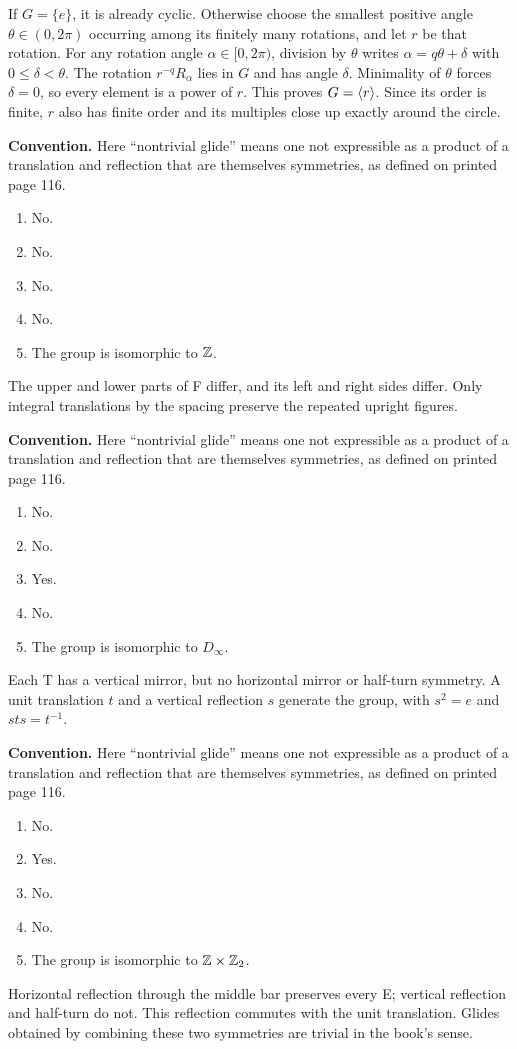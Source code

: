 If $G=\{e\}$, it is already cyclic. Otherwise choose the smallest positive angle $\theta\in(0,2\pi)$ occurring among its finitely many rotations, and let $r$ be that rotation. For any rotation angle $\alpha\in[0,2\pi)$, division by $\theta$ writes $\alpha=q\theta+\delta$ with $0\le\delta<\theta$. The rotation $r^{-q}R_\alpha$ lies in $G$ and has angle $\delta$. Minimality of $\theta$ forces $\delta=0$, so every element is a power of $r$. This proves $G=\langle r\rangle$. Since its order is finite, $r$ also has finite order and its multiples close up exactly around the circle.

\textbf{Convention.} Here ``nontrivial glide'' means one not expressible as a product of a translation and reflection that are themselves symmetries, as defined on printed page 116.
\begin{enumerate}[label=(\alph*)]\item No.\item No.\item No.\item No.\item The group is isomorphic to $\mathbb{Z}$.\end{enumerate}The upper and lower parts of F differ, and its left and right sides differ. Only integral translations by the spacing preserve the repeated upright figures.

\textbf{Convention.} Here ``nontrivial glide'' means one not expressible as a product of a translation and reflection that are themselves symmetries, as defined on printed page 116.
\begin{enumerate}[label=(\alph*)]\item No.\item No.\item Yes.\item No.\item The group is isomorphic to $D_\infty$.\end{enumerate}Each T has a vertical mirror, but no horizontal mirror or half-turn symmetry. A unit translation $t$ and a vertical reflection $s$ generate the group, with $s^2=e$ and $sts=t^{-1}$.

\textbf{Convention.} Here ``nontrivial glide'' means one not expressible as a product of a translation and reflection that are themselves symmetries, as defined on printed page 116.
\begin{enumerate}[label=(\alph*)]\item No.\item Yes.\item No.\item No.\item The group is isomorphic to $\mathbb{Z}\times\mathbb{Z}_2$.\end{enumerate}Horizontal reflection through the middle bar preserves every E; vertical reflection and half-turn do not. This reflection commutes with the unit translation. Glides obtained by combining these two symmetries are trivial in the book's sense.

